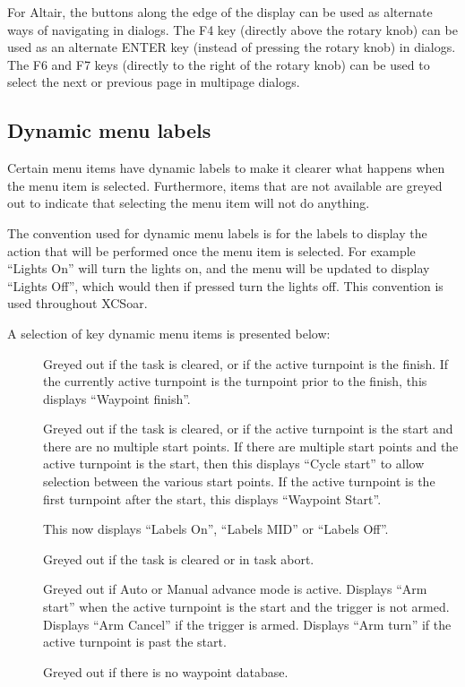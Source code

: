 For Altair, the buttons along the edge of the display can be used as
alternate ways of navigating in dialogs.  The F4 key (directly above
the rotary knob) can be used as an alternate ENTER key (instead of
pressing the rotary knob) in dialogs.  The F6 and F7 keys (directly to
the right of the rotary knob) can be used to select the next or
previous page in multipage dialogs.

\subsection*{Dynamic menu labels}
Certain menu items have dynamic labels to make it clearer what happens when the
menu item is selected.  Furthermore, items that are not available are greyed
out to indicate that selecting the menu item will not do anything.

The convention used for dynamic menu labels is for the labels to display the
action that will be performed once the menu item is selected. For example 
``Lights On'' will turn the lights on, and the menu will be updated to display
``Lights Off'', which would then if pressed turn the lights off. This
convention is used throughout XCSoar.

A selection of key dynamic menu items is presented below:
\begin{description}
\item[]  
  Greyed out if the task is cleared, or if the active turnpoint is the
  finish. If the currently active turnpoint is the turnpoint prior to the finish, this displays  ``Waypoint finish''.
\item[]  
  Greyed out if the task is cleared, or if the active turnpoint is the
  start and there are no multiple start points.  If there are multiple
  start points and the active turnpoint is the start, then this
  displays ``Cycle start'' to allow selection between the various
  start points.  If the active turnpoint is the first turnpoint after the start, this displays ``Waypoint Start''.
\item[]  
  This now displays ``Labels On'', ``Labels MID'' or ``Labels Off''.
\item[]  
  Greyed out if the task is cleared or in task abort.
\item[]  
  Greyed out if Auto or Manual advance mode is active.  Displays ``Arm
  start'' when the active turnpoint is the start and the trigger is
  not armed.  Displays ``Arm Cancel'' if the trigger is armed.
  Displays ``Arm turn'' if the active turnpoint is past the start.
\item[]
  Greyed out if there is no waypoint database.
\end{description}

